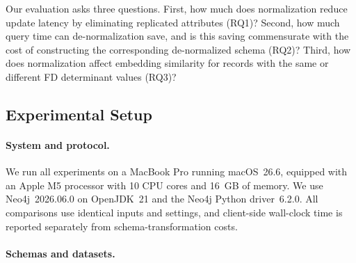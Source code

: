 \documentclass[sigconf]{acmart}
\begin{document}
Our evaluation asks three questions. First, how much does normalization reduce
update latency by eliminating replicated attributes (RQ1)? Second, how much query
time can de-normalization save, and is this saving commensurate with the cost
of constructing the corresponding de-normalized schema (RQ2)? Third, how does
normalization affect embedding similarity for records with the same or
different FD determinant values (RQ3)?

\subsection{Experimental Setup}

\paragraph{System and protocol.}
We run all experiments on a MacBook Pro running macOS~26.6, equipped with an
Apple M5 processor with 10 CPU cores and 16~GB of memory. We use
Neo4j~2026.06.0 on OpenJDK~21 and the Neo4j Python driver~6.2.0.
All comparisons use identical inputs and settings, and client-side wall-clock
time is reported separately from schema-transformation costs.

\paragraph{Schemas and datasets.}
\begin{table}[htbp]
\vspace{-10pt}
\centering
\setlength{\abovecaptionskip}{1pt}
\caption{Datasets used in the experiments.}
\label{tab:dataset_characteristics}
\vspace{-4pt}
\end{table}
\end{document}
